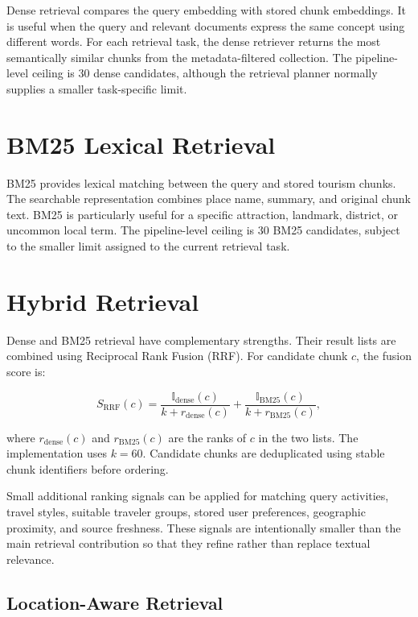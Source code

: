 Dense retrieval compares the query embedding with stored chunk embeddings. It
is useful when the query and relevant documents express the same concept using
different words. For each retrieval task, the dense retriever returns the most
semantically similar chunks from the metadata-filtered collection. The
pipeline-level ceiling is 30 dense candidates, although the retrieval planner
normally supplies a smaller task-specific limit.

\section{BM25 Lexical Retrieval}

BM25 provides lexical matching between the query and stored tourism chunks. The
searchable representation combines place name, summary, and original chunk
text. BM25 is particularly useful for a specific attraction, landmark,
district, or uncommon local term. The pipeline-level ceiling is 30 BM25
candidates, subject to the smaller limit assigned to the current retrieval
task.

\section{Hybrid Retrieval}

Dense and BM25 retrieval have complementary strengths. Their result lists are
combined using Reciprocal Rank Fusion (RRF). For candidate chunk $c$, the
fusion score is:

\begin{equation}
S_{\mathrm{RRF}}(c)
=
\frac{\mathbb{I}_{\mathrm{dense}}(c)}{k+r_{\mathrm{dense}}(c)}
+
\frac{\mathbb{I}_{\mathrm{BM25}}(c)}{k+r_{\mathrm{BM25}}(c)},
\end{equation}

where $r_{\mathrm{dense}}(c)$ and $r_{\mathrm{BM25}}(c)$ are the ranks of $c$
in the two lists. The implementation uses $k=60$. Candidate chunks are
deduplicated using stable chunk identifiers before ordering.

Small additional ranking signals can be applied for matching query activities,
travel styles, suitable traveler groups, stored user preferences, geographic
proximity, and source freshness. These signals are intentionally smaller than
the main retrieval contribution so that they refine rather than replace textual
relevance.

\subsection{Location-Aware Retrieval}

